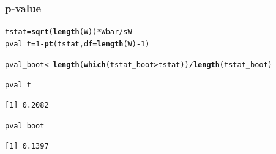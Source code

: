 \documentclass{beamer}\usepackage[]{graphicx}\usepackage[]{color}
\makeatletter
\newcommand{\hlnum}[1]{\textcolor[rgb]{0.2,0.2,0.2}{#1}}%
\newcommand{\hlopt}[1]{\textcolor[rgb]{0.102,0.102,0.102}{#1}}%
\newcommand{\hlstd}[1]{\textcolor[rgb]{0.102,0.102,0.102}{#1}}%
\newcommand{\hlkwb}[1]{\textcolor[rgb]{0.102,0.102,0.102}{#1}}%
\newcommand{\hlkwc}[1]{\textcolor[rgb]{0.2,0.2,0.2}{#1}}%
\newcommand{\hlkwd}[1]{\textcolor[rgb]{0.102,0.102,0.102}{\textbf{#1}}}%
\newenvironment{kframe}{%
 \def\at@end@of@kframe{}%
 \ifinner\ifhmode%
  \def\at@end@of@kframe{\end{minipage}}%
  \begin{minipage}{\columnwidth}%
 \fi\fi%
 \def\FrameCommand##1{\hskip\@totalleftmargin \hskip-\fboxsep
 \colorbox{shadecolor}{##1}\hskip-\fboxsep
     \hskip-\linewidth \hskip-\@totalleftmargin \hskip\columnwidth}%
 \MakeFramed {\advance\hsize-\width
   \@totalleftmargin\z@ \linewidth\hsize
   \@setminipage}}%
 {\par\unskip\endMakeFramed%
 \at@end@of@kframe}
\newenvironment{knitrout}{}{} %
\renewenvironment{knitrout}{\begin{spacing}{0.75}\begin{tiny}}{\end{tiny}\end{spacing}}
\makeatother
\begin{document}
\begin{frame}[fragile]
\frametitle{p-value}

\begin{knitrout}\small
{}\color{fgcolor}\begin{kframe}
\begin{alltt}
\hlstd{tstat} \hlkwb{=} \hlkwd{sqrt}\hlstd{(}\hlkwd{length}\hlstd{(W))}\hlopt{*}\hlstd{Wbar}\hlopt{/}\hlstd{sW}
\hlstd{pval_t} \hlkwb{=} \hlnum{1} \hlopt{-} \hlkwd{pt}\hlstd{(tstat,}\hlkwc{df}\hlstd{=}\hlkwd{length}\hlstd{(W)}\hlopt{-}\hlnum{1}\hlstd{)}

\hlstd{pval_boot} \hlkwb{<-} \hlkwd{length}\hlstd{(}\hlkwd{which}\hlstd{(tstat_boot} \hlopt{>} \hlstd{tstat))}\hlopt{/}\hlkwd{length}\hlstd{(tstat_boot)}

\hlstd{pval_t}
\end{alltt}
\begin{verbatim}
[1] 0.2082
\end{verbatim}
\begin{alltt}
\hlstd{pval_boot}
\end{alltt}
\begin{verbatim}
[1] 0.1397
\end{verbatim}
\end{kframe}
\end{knitrout}

\end{frame}

% 
% 
% 
% 
\end{document}
